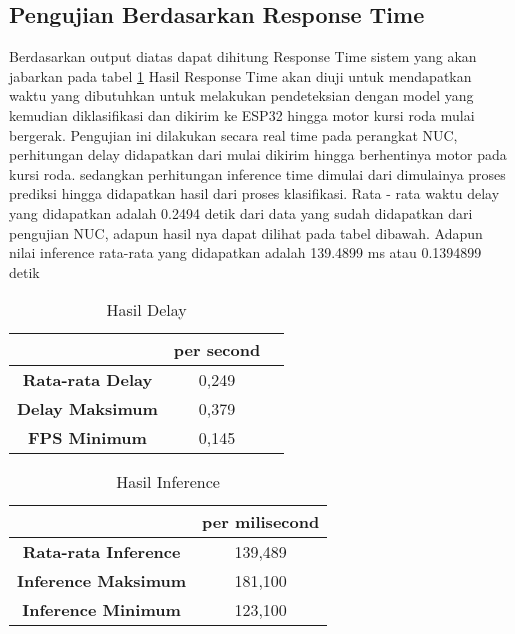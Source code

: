 \subsection{Pengujian Berdasarkan Response Time}
Berdasarkan output diatas dapat dihitung Response Time sistem yang akan jabarkan pada tabel \ref{tb:Hasil Pengujian Response Time} Hasil Response Time akan diuji untuk mendapatkan waktu yang dibutuhkan untuk melakukan pendeteksian dengan model yang kemudian diklasifikasi dan dikirim ke ESP32 hingga motor kursi roda mulai bergerak. Pengujian ini dilakukan secara real time pada perangkat NUC, perhitungan delay didapatkan dari mulai dikirim hingga berhentinya motor pada kursi roda. sedangkan perhitungan inference time dimulai dari dimulainya proses prediksi hingga didapatkan hasil dari proses klasifikasi. Rata - rata waktu delay yang didapatkan adalah 0.2494 detik dari data yang sudah didapatkan dari pengujian NUC, adapun hasil nya dapat dilihat pada tabel dibawah. Adapun nilai inference rata-rata yang didapatkan adalah  139.4899 ms atau 0.1394899 detik
\begin{table}[H]
    \centering
    \caption{Hasil Delay}
    \label{tb:Hasil Pengujian Response Time}
    \begin{tabular}{|c|c|c|}
        \hline 
        \cellcolor[HTML]{000000}                        & \cellcolor[HTML]{C0C0C0} \textbf{per second}  \\ \hline
        \cellcolor[HTML]{C0C0C0} \textbf{Rata-rata Delay} & 0,249                                                                        \\ \hline
        \cellcolor[HTML]{C0C0C0} \textbf{Delay Maksimum}  & 0,379                                                                      \\ \hline
        \cellcolor[HTML]{C0C0C0} \textbf{FPS Minimum}   & 0,145                                                                      \\ \hline
    \end{tabular}
\end{table}

\begin{table}[H]
    \centering
    \caption{Hasil Inference}
    \label{tb:Hasil Inference}
    \begin{tabular}{|c|c|}
        \hline 
        \cellcolor[HTML]{000000}                        & \cellcolor[HTML]{C0C0C0} \textbf{per milisecond}   \\ \hline
        \cellcolor[HTML]{C0C0C0} \textbf{Rata-rata Inference} & 139,489                                                                       \\ \hline
        \cellcolor[HTML]{C0C0C0} \textbf{Inference Maksimum}  & 181,100                                                                        \\ \hline
        \cellcolor[HTML]{C0C0C0} \textbf{Inference Minimum}   & 123,100                                                                       \\ \hline
    \end{tabular}
\end{table}

